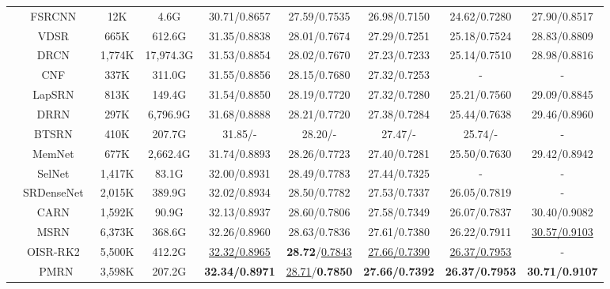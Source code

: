 \documentclass[journal]{IEEEtran}
\begin{document}
\begin{table*}[!ht]
\begin{tabular}{|c|c|c|c|c|c|c|c|c|}
		&FSRCNN~\cite{fsrcnn}&12K&4.6G& 
		30.71/0.8657& 27.59/0.7535& 26.98/0.7150& 24.62/0.7280& 27.90/0.8517\\
		
		&VDSR~\cite{vdsr}&665K&612.6G& 
		31.35/0.8838& 28.01/0.7674& 27.29/0.7251& 25.18/0.7524& 28.83/0.8809\\
		
		&DRCN~\cite{drcn_ghifary2016deep}&1,774K&17,974.3G& 
		31.53/0.8854& 28.02/0.7670& 27.23/0.7233& 25.14/0.7510& 28.98/0.8816\\
		
		&CNF~\cite{cnf_ren2017image}&337K&311.0G& 
		31.55/0.8856& 28.15/0.7680& 27.32/0.7253& - & - \\
		
		&LapSRN~\cite{lapsrn}&813K&149.4G& 
		31.54/0.8850& 28.19/0.7720& 27.32/0.7280& 25.21/0.7560& 29.09/0.8845\\
		
		&DRRN~\cite{drrn_tai2017image}&297K&6,796.9G& 
		31.68/0.8888& 28.21/0.7720& 27.38/0.7284& 25.44/0.7638& 29.46/0.8960\\
		
		&BTSRN~\cite{btsrn_fan2017balanced}&410K&207.7G& 
		31.85/-& 28.20/-& 27.47/-& 25.74/-& -\\
		
		&MemNet~\cite{memnet}&677K&2,662.4G& 
		31.74/0.8893& 28.26/0.7723& 27.40/0.7281& 25.50/0.7630& 29.42/0.8942 \\
		
		&SelNet~\cite{selnet_choi2017deep}&1,417K&83.1G& 
		32.00/0.8931& 28.49/0.7783& 27.44/0.7325& - &  - \\
		
		&SRDenseNet~\cite{srdensenet}&2,015K&389.9G&
		32.02/0.8934& 28.50/0.7782& 27.53/0.7337& 26.05/0.7819& - \\
		
		&CARN~\cite{carn}&1,592K&90.9G& 
		32.13/0.8937& 28.60/0.7806& 27.58/0.7349& 26.07/0.7837& 30.40/0.9082\\
		
		&MSRN~\cite{msrn}&6,373K& 368.6G& 
		32.26/0.8960& 28.63/0.7836& 27.61/0.7380& 26.22/0.7911& \underline{30.57/0.9103} \\
		
		&OISR-RK2~\cite{oisr}&5,500K&412.2G&
		\underline{32.32/0.8965}& \textbf{28.72}/\underline{0.7843}& \underline{27.66/0.7390}& \underline{26.37/0.7953}& - \\
		
		&PMRN&3,598K& 207.2G& 
		\textbf{32.34/0.8971}& \underline{28.71}/\textbf{0.7850}& \textbf{27.66/0.7392}& \textbf{26.37/0.7953}& \textbf{30.71/0.9107}  \\
		

\end{tabular}
\end{table*}
\end{document}
